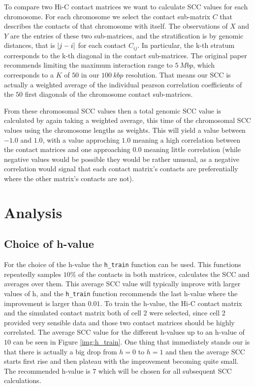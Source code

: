 \documentclass[10pt,abstract=true,titlepage=false,toc=bib]{scrartcl}
\begin{document}
To compare two Hi-C contact matrices we want to calculate SCC values for each chromosome. For each chromosome we select the contact sub-matrix \(C\) that describes the contacts of that chromosome with itself. The observations of \(X\) and \(Y\) are the entries of these two sub-matrices, and the stratification is by genomic distances, that is \(\abs{j-i}\) for each contact \(C_{ij}\). In particular, the k-th stratum corresponds to the k-th diagonal in the contact sub-matrices. The original paper recommends limiting the maximum interaction range to \(\SI{5}{Mbp}\), which corresponds to a \(K\) of \(50\) in our \(\SI{100}{kbp}\) resolution. That means our SCC is actually a weighted average of the individual pearson correlation coefficients of the \(50\) first diagonals of the chromosome contact sub-matrices.

From these chromosomal SCC values then a total genomic SCC value is calculated by again taking a weighted average, this time of the chromosomal SCC values using the chromosome lengths as weights. This will yield a value between \(-1.0\) and \(1.0\), with a value approching \(1.0\) meaning a high correlation between the contact matrices and one approaching \(0.0\) meaning little correlation (while negative values would be possible they would be rather unusual, as a negative correlation would signal that each contact matrix's contacts are preferentially where the other matrix's contacts are not).



\section{Analysis} %
\label{sec:analysis}

\subsection{Choice of h-value} %
\label{sub:choice_of_h_value}

For the choice of the h-value the \verb|h_train| function can be used. This functions repeatedly samples \(10\%\) of the contacts in both matrices, calculates the SCC and averages over them. This average SCC value will typically improve with larger values of h, and the \verb|h_train| function recommends the last h-value where the improvement is larger than \(0.01\). To train the h-value, the Hi-C contact matrix and the simulated contact matrix both of cell 2 were selected, since cell 2 provided very sensible data and those two contact matrices should be highly correlated. The average SCC value for the different h-values up to an h-value of \(10\) can be seen in Figure \ref{img:h_train}. One thing that immediately stands our is that there is actually a big drop from \(h=0\) to \(h=1\) and then the average SCC starts first rise and then plateau with the improvement becoming quite small. The recommended h-value is \(7\) which will be chosen for all subsequent SCC calculations.
\end{document}
